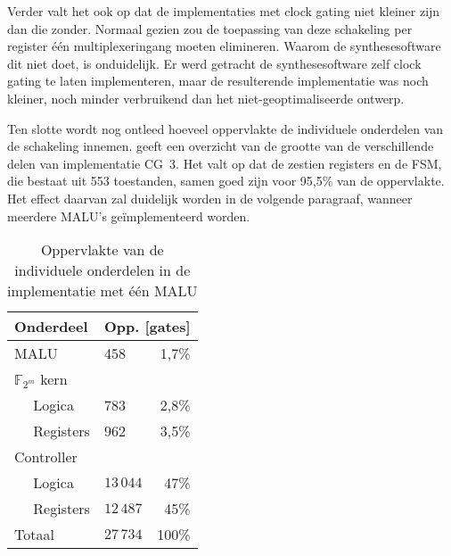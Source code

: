 Verder valt het ook op dat de implementaties met clock gating niet kleiner zijn dan die zonder. Normaal gezien zou de toepassing van deze schakeling per register \'e\'en multiplexeringang moeten elimineren. Waarom de synthesesoftware dit niet doet, is onduidelijk. Er werd getracht de synthesesoftware zelf clock gating te laten implementeren, maar de resulterende implementatie was noch kleiner, noch minder verbruikend dan het niet-geoptimaliseerde ontwerp.


Ten slotte wordt nog ontleed hoeveel oppervlakte de individuele onderdelen van de schakeling innemen.  geeft een overzicht van de grootte van de verschillende delen van implementatie CG~3. Het valt op dat de zestien registers en de FSM, die bestaat uit 553 toestanden, samen goed zijn voor 95,5\% van de oppervlakte. Het effect daarvan zal duidelijk worden in de volgende paragraaf, wanneer meerdere MALU's ge\"implementeerd worden.

\begin{table}[h]
	\caption{Oppervlakte van de individuele onderdelen in de implementatie met \'e\'en MALU}
	\label{tabel-resultaten-onderdelen}

	\centering
	\begin{tabular}{llr}
		\toprule
		Onderdeel					& \multicolumn{2}{c}{Opp. [gates]}\\
		\midrule
		MALU				 			& 458			& 1,7\%\\
		$\mathbb{F}_{2^m}$ kern	&				& \\
		$\quad$ Logica				& 783			& 2,8\%\\
		$\quad$ Registers			& 962			& 3,5\%\\
		Controller					&				& \\
		$\quad$ Logica				& $13\,044$	& 47\%\\
		$\quad$ Registers			& $12\,487$	& 45\%\\
		\midrule
		Totaal						& $27\,734$	& 100\%\\
		\bottomrule		
	\end{tabular}
\end{table}


